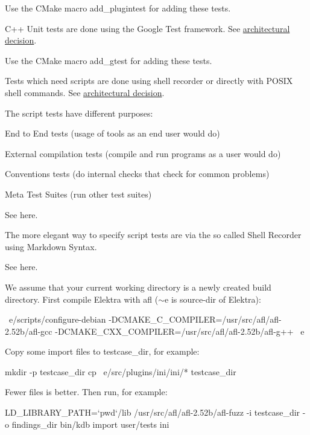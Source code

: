 Use the C\+Make macro {\ttfamily add\+\_\+plugintest} for adding these tests.

C++ Unit tests are done using the Google Test framework. See \hyperlink{doc_decisions_unit_testing_md}{architectural decision}.

Use the C\+Make macro {\ttfamily add\+\_\+gtest} for adding these tests.

Tests which need scripts are done using shell recorder or directly with P\+O\+S\+IX shell commands. See \hyperlink{doc_decisions_script_testing_md}{architectural decision}.

The script tests have different purposes\+:


\begin{DoxyItemize}
\item End to End tests (usage of tools as an end user would do)
\item External compilation tests (compile and run programs as a user would do)
\item Conventions tests (do internal checks that check for common problems)
\item Meta Test Suites (run other test suites)
\end{DoxyItemize}

See here.

The more elegant way to specify script tests are via the so called Shell Recorder using Markdown Syntax.

See here.

We assume that your current working directory is a newly created build directory. First compile Elektra with afl ($\sim$e is source-\/dir of Elektra)\+:


\begin{DoxyCode}
~e/scripts/configure-debian -DCMAKE\_C\_COMPILER=/usr/src/afl/afl-2.52b/afl-gcc
       -DCMAKE\_CXX\_COMPILER=/usr/src/afl/afl-2.52b/afl-g++ ~e
\end{DoxyCode}


Copy some import files to {\ttfamily testcase\+\_\+dir}, for example\+:


\begin{DoxyCode}
mkdir -p testcase\_dir
cp ~e/src/plugins/ini/ini/* testcase\_dir
\end{DoxyCode}


Fewer files is better. Then run, for example\+:


\begin{DoxyCode}
LD\_LIBRARY\_PATH=`pwd`/lib /usr/src/afl/afl-2.52b/afl-fuzz -i testcase\_dir -o findings\_dir bin/kdb import
       user/tests ini
\end{DoxyCode}


